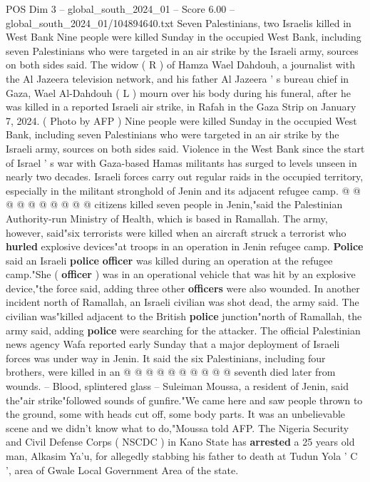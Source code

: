 \begin{textsample}{POS Dim 3 – global\_south\_2024\_01 – Score 6.00 – global\_south\_2024\_01/104894640.txt}  \label{ex:f3_pos_384}
Seven Palestinians, two Israelis killed in West Bank Nine people were killed Sunday in the occupied West Bank, including seven Palestinians who were targeted in an air strike by the Israeli army, sources on both sides said.
The widow ( R ) of Hamza Wael Dahdouh, a journalist with the Al Jazeera television network, and his father Al Jazeera ' s bureau chief in Gaza, Wael Al-Dahdouh ( L ) mourn over his body during his funeral, after he was killed in a reported Israeli air strike, in Rafah in the Gaza Strip on January 7, 2024. ( Photo by AFP ) Nine people were killed Sunday in the occupied West Bank, including seven Palestinians who were targeted in an air strike by the Israeli army, sources on both sides said.
Violence in the West Bank since the start of Israel ' s war with Gaza-based Hamas militants has surged to levels unseen in nearly two decades.
Israeli forces carry out regular raids in the occupied territory, especially in the militant stronghold of Jenin and its adjacent refugee camp. @ @ @ @ @ @ @ @ @ @ citizens killed seven people in Jenin,"said the Palestinian Authority-run Ministry of Health, which is based in Ramallah.
The army, however, said"six terrorists were killed when an aircraft struck a terrorist who \textbf{hurled} explosive devices"at troops in an operation in Jenin refugee camp. \textbf{Police} said an Israeli \textbf{police} \textbf{officer} was killed during an operation at the refugee camp."She ( \textbf{officer} ) was in an operational vehicle that was hit by an explosive device,"the force said, adding three other \textbf{officers} were also wounded.
In another incident north of Ramallah, an Israeli civilian was shot dead, the army said.
The civilian was"killed adjacent to the British \textbf{police} junction"north of Ramallah, the army said, adding \textbf{police} were searching for the attacker.
The official Palestinian news agency Wafa reported early Sunday that a major deployment of Israeli forces was under way in Jenin.
It said the six Palestinians, including four brothers, were killed in an @ @ @ @ @ @ @ @ @ @ seventh died later from wounds. -- Blood, splintered glass -- Suleiman Moussa, a resident of Jenin, said the"air strike"followed sounds of gunfire."We came here and saw people thrown to the ground, some with heads cut off, some body parts.
It was an unbelievable scene and we didn't know what to do,"Moussa told AFP.
The Nigeria Security and Civil Defense Corps ( NSCDC ) in Kano State has \textbf{arrested} a 25 years old man, Alkasim Ya'u, for allegedly stabbing his father to death at Tudun Yola ' C ', area of Gwale Local Government Area of the state.

\end{textsample}
